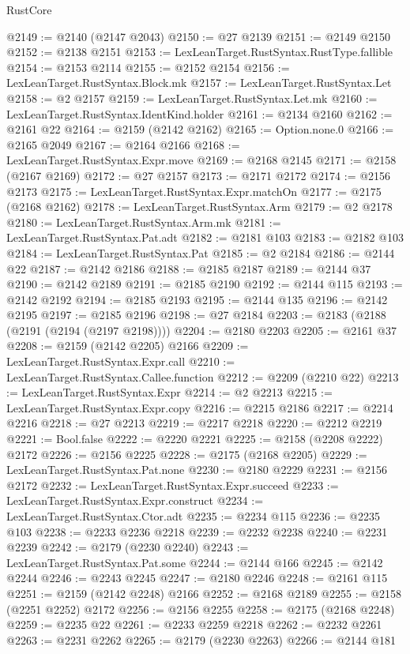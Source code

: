 \begin{lexlean}{RustCore}
\begin{coremodule}
@2149 := @2140 (@2147 @2043)
@2150 := @27 @2139
@2151 := @2149 @2150
@2152 := @2138 @2151
@2153 := LexLeanTarget.RustSyntax.RustType.fallible
@2154 := @2153 @2114
@2155 := @2152 @2154
@2156 := LexLeanTarget.RustSyntax.Block.mk
@2157 := LexLeanTarget.RustSyntax.Let
@2158 := @2 @2157
@2159 := LexLeanTarget.RustSyntax.Let.mk
@2160 := LexLeanTarget.RustSyntax.IdentKind.holder
@2161 := @2134 @2160
@2162 := @2161 @22
@2164 := @2159 (@2142 @2162)
@2165 := Option.none.{0}
@2166 := @2165 @2049
@2167 := @2164 @2166
@2168 := LexLeanTarget.RustSyntax.Expr.move
@2169 := @2168 @2145
@2171 := @2158 (@2167 @2169)
@2172 := @27 @2157
@2173 := @2171 @2172
@2174 := @2156 @2173
@2175 := LexLeanTarget.RustSyntax.Expr.matchOn
@2177 := @2175 (@2168 @2162)
@2178 := LexLeanTarget.RustSyntax.Arm
@2179 := @2 @2178
@2180 := LexLeanTarget.RustSyntax.Arm.mk
@2181 := LexLeanTarget.RustSyntax.Pat.adt
@2182 := @2181 @103
@2183 := @2182 @103
@2184 := LexLeanTarget.RustSyntax.Pat
@2185 := @2 @2184
@2186 := @2144 @22
@2187 := @2142 @2186
@2188 := @2185 @2187
@2189 := @2144 @37
@2190 := @2142 @2189
@2191 := @2185 @2190
@2192 := @2144 @115
@2193 := @2142 @2192
@2194 := @2185 @2193
@2195 := @2144 @135
@2196 := @2142 @2195
@2197 := @2185 @2196
@2198 := @27 @2184
@2203 := @2183 (@2188 (@2191 (@2194 (@2197 @2198))))
@2204 := @2180 @2203
@2205 := @2161 @37
@2208 := @2159 (@2142 @2205) @2166
@2209 := LexLeanTarget.RustSyntax.Expr.call
@2210 := LexLeanTarget.RustSyntax.Callee.function
@2212 := @2209 (@2210 @22)
@2213 := LexLeanTarget.RustSyntax.Expr
@2214 := @2 @2213
@2215 := LexLeanTarget.RustSyntax.Expr.copy
@2216 := @2215 @2186
@2217 := @2214 @2216
@2218 := @27 @2213
@2219 := @2217 @2218
@2220 := @2212 @2219
@2221 := Bool.false
@2222 := @2220 @2221
@2225 := @2158 (@2208 @2222) @2172
@2226 := @2156 @2225
@2228 := @2175 (@2168 @2205)
@2229 := LexLeanTarget.RustSyntax.Pat.none
@2230 := @2180 @2229
@2231 := @2156 @2172
@2232 := LexLeanTarget.RustSyntax.Expr.succeed
@2233 := LexLeanTarget.RustSyntax.Expr.construct
@2234 := LexLeanTarget.RustSyntax.Ctor.adt
@2235 := @2234 @115
@2236 := @2235 @103
@2238 := @2233 @2236 @2218
@2239 := @2232 @2238
@2240 := @2231 @2239
@2242 := @2179 (@2230 @2240)
@2243 := LexLeanTarget.RustSyntax.Pat.some
@2244 := @2144 @166
@2245 := @2142 @2244
@2246 := @2243 @2245
@2247 := @2180 @2246
@2248 := @2161 @115
@2251 := @2159 (@2142 @2248) @2166
@2252 := @2168 @2189
@2255 := @2158 (@2251 @2252) @2172
@2256 := @2156 @2255
@2258 := @2175 (@2168 @2248)
@2259 := @2235 @22
@2261 := @2233 @2259 @2218
@2262 := @2232 @2261
@2263 := @2231 @2262
@2265 := @2179 (@2230 @2263)
@2266 := @2144 @181

\end{coremodule}
\end{lexlean}
